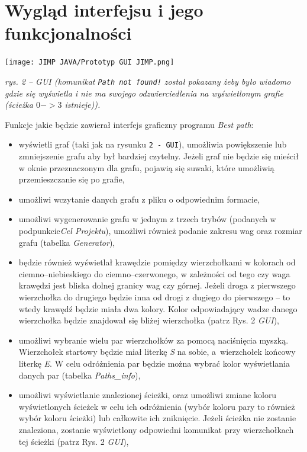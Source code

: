 \documentclass[12pt, a4paper]{article}
\begin{document}
\section{Wygląd interfejsu i jego funkcjonalności}

\begin{center}
\texttt{[image: JIMP JAVA/Prototyp GUI JIMP.png]}
\caption{\textit{rys. 2 -- GUI (komunikat \texttt{Path not found!} został pokazany żeby było wiadomo gdzie się wyświetla i nie ma swojego odzwierciedlenia na wyświetlonym grafie (ścieżka $0->3$ istnieje)).} \label{overflow}}
\end{center}

Funkcje jakie będzie zawierał interfejs graficzny programu \textit{Best path}:
\begin{itemize}
    \item wyświetli graf (taki jak na rysunku \texttt{2 - GUI}), umożliwia powiększenie lub zmniejszenie grafu aby był bardziej czytelny. Jeżeli graf nie będzie się mieścił w oknie przeznaczonym dla grafu, pojawią się suwaki, które umożliwią przemieszczanie się po grafie,
    \item umożliwi wczytanie danych grafu z pliku o odpowiednim formacie,
    \item umożliwi wygenerowanie grafu w jednym z trzech trybów (podanych w podpunkcie\textit{Cel Projektu}), umożliwi również podanie zakresu wag oraz rozmiar grafu (tabelka \textit{Generator}),
    \item będzie również wyświetlał krawędzie pomiędzy wierzchołkami w kolorach od ciemno--niebieskiego do ciemno--czerwonego, w zależności od tego czy waga krawędzi jest bliska dolnej granicy wag czy górnej. Jeżeli droga z pierwszego wierzchołka do drugiego będzie inna od drogi z dugiego do pierwszego -- to wtedy krawędź będzie miała dwa kolory. Kolor odpowiadający wadze danego wierzchołka będzie znajdował się bliżej wierzchołka (patrz Rys. 2 \textit{GUI}),
    \item umożliwi wybranie wielu par wierzchołków za pomocą naciśnięcia myszką. Wierzchołek startowy będzie miał literkę \textit{S} na sobie, a~wierzchołek końcowy literkę \textit{E}. W celu odróżnienia par będzie można wybrać kolor wyświetlania danych par (tabelka \textit{Paths\_info}),
    \item umożliwi wyświetlanie znalezionej ścieżki, oraz umożliwi zmiane koloru wyświetlonych ścieżek w celu ich odróżnienia (wybór koloru pary to również wybór koloru ścieżki) lub całkowite ich zniknięcie. Jeżeli ścieżka nie zostanie znaleziona, zostanie wyświetlony odpowiedni komunikat przy wierzchołkach tej ścieżki (patrz Rys. 2 \textit{GUI}),

\end{itemize}
\end{document}
